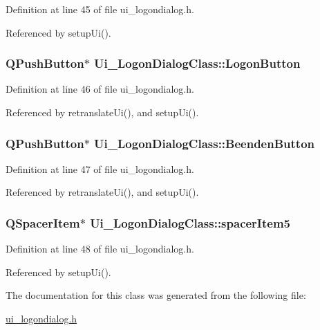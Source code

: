 Definition at line 45 of file ui\_\-logondialog.h.

Referenced by setupUi().\hypertarget{class_ui___logon_dialog_class_bf53b358f3ad06c45d331e4b5109fd52}{
\subsubsection[LogonButton]{\setlength{\rightskip}{0pt plus 5cm}QPushButton$\ast$ {\bf Ui\_\-LogonDialogClass::LogonButton}}}
\label{class_ui___logon_dialog_class_bf53b358f3ad06c45d331e4b5109fd52}




Definition at line 46 of file ui\_\-logondialog.h.

Referenced by retranslateUi(), and setupUi().\hypertarget{class_ui___logon_dialog_class_9f8ea43f1be904f080b5056f4bd213a0}{
\subsubsection[BeendenButton]{\setlength{\rightskip}{0pt plus 5cm}QPushButton$\ast$ {\bf Ui\_\-LogonDialogClass::BeendenButton}}}
\label{class_ui___logon_dialog_class_9f8ea43f1be904f080b5056f4bd213a0}




Definition at line 47 of file ui\_\-logondialog.h.

Referenced by retranslateUi(), and setupUi().\hypertarget{class_ui___logon_dialog_class_ceae637a726d694fc7423a135ec56a47}{
\subsubsection[spacerItem5]{\setlength{\rightskip}{0pt plus 5cm}QSpacerItem$\ast$ {\bf Ui\_\-LogonDialogClass::spacerItem5}}}
\label{class_ui___logon_dialog_class_ceae637a726d694fc7423a135ec56a47}




Definition at line 48 of file ui\_\-logondialog.h.

Referenced by setupUi().

The documentation for this class was generated from the following file:\begin{CompactItemize}
\item 
\hyperlink{ui__logondialog_8h}{ui\_\-logondialog.h}\end{CompactItemize}
